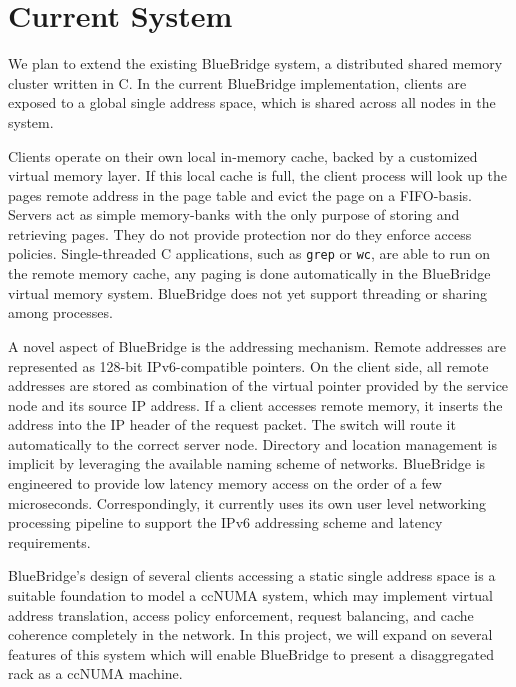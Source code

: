 \section{Current System}
\label{sec:current}
We plan to extend the existing BlueBridge system, a distributed shared
memory cluster written in C. 
In the current BlueBridge implementation, clients
are exposed to a global single address space, which is shared across all
nodes in the system.

Clients operate on their own local in-memory cache, backed by a
customized virtual memory layer. If this local cache is full, the
client process will look up the pages remote address in the page table
and evict the page on a FIFO-basis.  Servers act as simple
memory-banks with the only purpose of storing and retrieving pages.
They do not provide protection nor do they enforce access policies.
Single-threaded C applications, such as \texttt{grep} or \texttt{wc},
are able to run on the remote memory cache, any paging is done
automatically in the BlueBridge virtual memory system.  BlueBridge
does not yet support threading or sharing among processes.

A novel aspect of BlueBridge is the addressing mechanism. Remote
addresses are represented as 128-bit IPv6-compatible pointers. On the
client side, all remote addresses are stored as combination of the
virtual pointer provided by the service node and its source IP
address. If a client accesses remote memory, it inserts the address
into the IP header of the request packet. The switch will route it
automatically to the correct server node. Directory and location
management is implicit by leveraging the available naming scheme of
networks.  BlueBridge is engineered to provide low latency memory
access on the order of a few microseconds. Correspondingly, it
currently uses its own user level networking processing pipeline to
support the IPv6 addressing scheme and latency requirements.

BlueBridge's design of several clients accessing a static single
address space is a suitable foundation to model a ccNUMA system, which may
implement virtual address translation, access policy enforcement,
request balancing, and cache coherence completely in the network.
In this project, we will expand on several features of this system
which will enable BlueBridge to present a disaggregated rack as a ccNUMA
machine.
